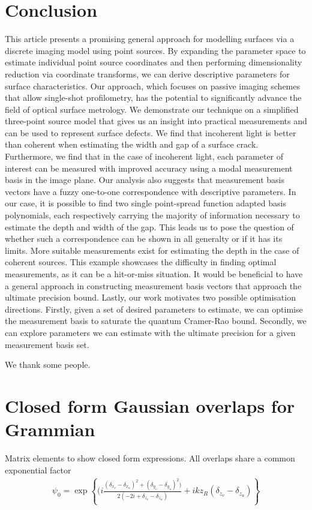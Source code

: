 \documentclass[reprint,amsmath,amssymb,aps,pra,floatfix]{revtex4-2}
\begin{document}
\section{\label{sec:conc} Conclusion}
This article presents a promising general approach for modelling surfaces via a discrete imaging model using point sources. By expanding the parameter space to estimate individual point source coordinates and then performing dimensionality reduction via coordinate transforms, we can derive descriptive parameters for surface characteristics. Our approach, which focuses on passive imaging schemes that allow single-shot profilometry, has the potential to significantly advance the field of optical surface metrology.
We demonstrate our technique on a simplified three-point source model that gives us an insight into practical measurements and can be used to represent surface defects. We find that incoherent light is better than coherent when estimating the width and gap of a surface crack. Furthermore, we find that in the case of incoherent light, each parameter of interest can be measured with improved accuracy using a modal measurement basis in the image plane. Our analysis also suggests that measurement basis vectors have a fuzzy one-to-one correspondence with descriptive parameters. In our case, it is possible to find two single point-spread function adapted basis polynomials, each respectively carrying the majority of information necessary to estimate the depth and width of the gap. This leads us to pose the question of whether such a correspondence can be shown in all generalty or if it has its limits.
More suitable measurements exist for estimating the depth in the case of coherent sources. This example showcases the difficulty in finding optimal measurements, as it can be a hit-or-miss situation. It would be beneficial to have a general approach in constructing measurement basis vectors that approach the ultimate precision bound.
Lastly, our work motivates two possible optimisation directions. Firstly, given a set of desired parameters to estimate, we can optimise the measurement basis to saturate the quantum Cramer-Rao bound. Secondly, we can explore parameters we can estimate with the ultimate precision for a given measurement basis set.


\begin{acknowledgments}
We thank some people.
\end{acknowledgments}

\clearpage
\appendix
\onecolumngrid
\section{\label{app:gaussian_overlaps}Closed form Gaussian overlaps for Grammian}
Matrix elements to show closed form expressions.
All overlaps share a common exponential factor
\begin{align}
    \psi_0 = \exp \left \{ (i \frac{(\delta_{x_v} - \delta_{x_u})^2 + (\delta_{y_v} - \delta_{y_u})^2)}{2(-2i + \delta_{z_v} - \delta_{z_u})} + i k z_R (\delta_{z_v} - \delta_{z_u}) \right \}
\end{align}
\end{document}
